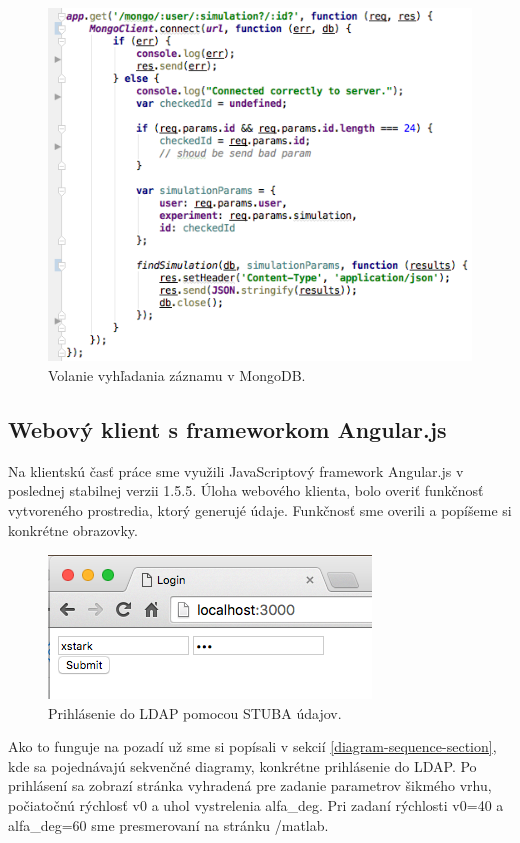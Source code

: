 \begin{figure}[H]
  \centering
  \includegraphics[scale=0.7]{img/code/express-mongodb-find2.png}
  \caption{Volanie vyhľadania záznamu v MongoDB.}
  \label{img-express-mongodb-find}
\end{figure}
 
\subsection{Webový klient s frameworkom Angular.js}\label{section-angular-web}
Na klientskú časť práce sme využili JavaScriptový framework Angular.js v poslednej stabilnej verzii 1.5.5. Úloha webového klienta, bolo overiť funkčnosť vytvoreného prostredia, ktorý generujé údaje. Funkčnosť sme overili a popíšeme si konkrétne obrazovky.

\begin{figure}[H]
  \centering
  \includegraphics[scale=0.7]{img/code/angular-login.png}
  \caption{Prihlásenie do LDAP pomocou STUBA údajov.}
  \label{img-angular-login}
\end{figure}

Ako to funguje na pozadí už sme si popísali v sekcií \ref{diagram-sequence-section}, kde sa pojednávajú sekvenčné diagramy, konkrétne prihlásenie do LDAP.
Po prihlásení sa zobrazí stránka vyhradená pre zadanie parametrov šikmého vrhu, počiatočnú rýchlosť v0 a uhol vystrelenia alfa\_deg. Pri zadaní rýchlosti v0=40 a alfa\_deg=60 sme presmerovaní na stránku /matlab.

